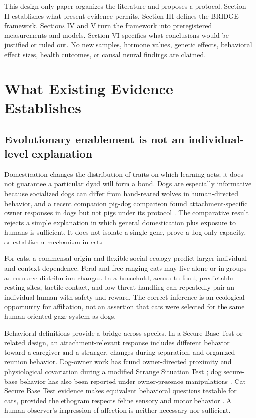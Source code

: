 \documentclass[conference]{IEEEtran}
\begin{document}
This design-only paper organizes the literature and proposes a protocol. Section II establishes what present evidence permits. Section III defines the BRIDGE framework. Sections IV and V turn the framework into preregistered measurements and models. Section VI specifies what conclusions would be justified or ruled out. No new samples, hormone values, genetic effects, behavioral effect sizes, health outcomes, or causal neural findings are claimed.

\section{What Existing Evidence Establishes}

\subsection{Evolutionary enablement is not an individual-level explanation}

Domestication changes the distribution of traits on which learning acts; it does not guarantee a particular dyad will form a bond. Dogs are especially informative because socialized dogs can differ from hand-reared wolves in human-directed behavior, and a recent companion pig-dog comparison found attachment-specific owner responses in dogs but not pigs under its protocol \cite{topal2005,gabor2024}. The comparative result rejects a simple explanation in which general domestication plus exposure to humans is sufficient. It does not isolate a single gene, prove a dog-only capacity, or establish a mechanism in cats.

For cats, a commensal origin and flexible social ecology predict larger individual and context dependence. Feral and free-ranging cats may live alone or in groups as resource distribution changes. In a household, access to food, predictable resting sites, tactile contact, and low-threat handling can repeatedly pair an individual human with safety and reward. The correct inference is an ecological opportunity for affiliation, not an assertion that cats were selected for the same human-oriented gaze system as dogs.

Behavioral definitions provide a bridge across species. In a Secure Base Test or related design, an attachment-relevant response includes different behavior toward a caregiver and a stranger, changes during separation, and organized reunion behavior. Dog-owner work has found owner-directed proximity and physiological covariation during a modified Strange Situation Test \cite{ryan2019,nagasawa2009}; dog secure-base behavior has also been reported under owner-presence manipulations \cite{horn2013}. Cat Secure Base Test evidence makes equivalent behavioral questions testable for cats, provided the ethogram respects feline sensory and motor behavior \cite{vitale2019}. A human observer's impression of affection is neither necessary nor sufficient.
\end{document}

